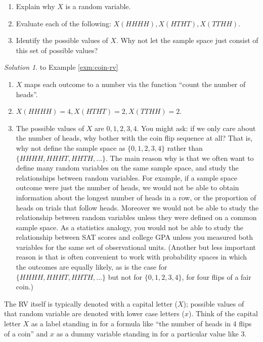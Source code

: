 \documentclass[
]{book}
\providecommand{\tightlist}{%
  \setlength{\itemsep}{0pt}\setlength{\parskip}{0pt}}
\theoremstyle{definition}
\theoremstyle{definition}
\theoremstyle{definition}
\theoremstyle{remark}
\newtheorem*{solution}{Solution}
\begin{document}
\begin{enumerate}
\def\labelenumi{\arabic{enumi}.}
\tightlist
\item
  Explain why \(X\) is a random variable.
\item
  Evaluate each of the following: \(X(HHHH), X(HTHT), X(TTHH)\).
\item
  Identify the possible values of \(X\). Why not let the sample space just consist of this set of possible values?
\end{enumerate}

\begin{solution}
{}to Example \ref{exm:coin-rv}
\end{solution}

\begin{enumerate}
\def\labelenumi{\arabic{enumi}.}
\tightlist
\item
  \(X\) maps each outcome to a number via the function ``count the number of heads''.
\item
  \(X(HHHH) = 4, X(HTHT) = 2, X(TTHH) = 2\).
\item
  The possible values of \(X\) are \(0, 1, 2, 3, 4\). You might ask: if we only care about the number of heads, why bother with the coin flip sequence at all? That is, why not define the sample space as \(\{0, 1, 2, 3, 4\}\) rather than \(\{HHHH, HHHT, HHTH, \ldots\}\). The main reason why is that we often want to define many random variables on the same sample space, and study the relationships between random variables. For example, if a sample space outcome were just the number of heads, we would not be able to obtain information about the longest number of heads in a row, or the proportion of heads on trials that follow heads. Moreover we would not be able to study the relationship between random variables unless they were defined on a common sample space. As a statistics analogy, you would not be able to study the relationship between SAT scores and college GPA unless you measured both variables for the same set of observational units. (Another but less important reason is that is often convenient to work with probability spaces in which the outcomes are equally likely, as is the case for \(\{HHHH, HHHT, HHTH, \ldots\}\) but not for \(\{0, 1, 2, 3, 4\}\), for four flips of a fair coin.)
\end{enumerate}

The RV itself is typically denoted with a capital letter (\(X\)); possible values of that
random variable are denoted with lower case letters (\(x\)). Think of the capital letter \(X\) as a label standing in for a formula like ``the number of heads in 4 flips of a coin'' and \(x\) as a dummy variable
standing in for a particular value like 3.
\end{document}
